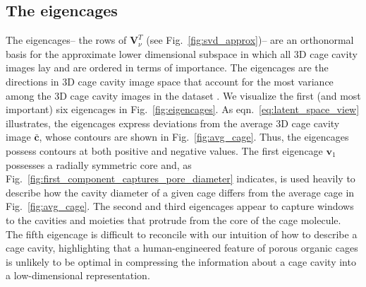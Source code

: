 \documentclass[journal=jacsat,manuscript=article,layout=traditional]{achemso}
\begin{document}
\subsection{The eigencages} The eigencages-- the rows of $\mathbf{V}_\nu^T$ (see Fig.~\ref{fig:svd_approx})-- are an orthonormal basis for the approximate lower dimensional subspace in which all 3D cage cavity images lay and are ordered in terms of importance. The eigencages are the directions in 3D cage cavity image space that account for the most variance among the 3D cage cavity images in the dataset \cite{strang1993introduction}. We visualize the first (and most important) six eigencages in Fig.~\ref{fig:eigencages}. As eqn.~\ref{eq:latent_space_view} illustrates, the eigencages express deviations from the average 3D cage cavity image $\bar{\mathbf{c}}$, whose contours are shown in Fig.~\ref{fig:avg_cage}. Thus, the eigencages possess contours at both positive and negative values. The first eigencage $\mathbf{v}_1$ possesses a radially symmetric core and, as Fig.~\ref{fig:first_component_captures_pore_diameter} indicates, is used heavily to describe how the cavity diameter of a given cage differs from the average cage in Fig.~\ref{fig:avg_cage}. The second and third eigencages appear to capture windows to the cavities and moieties that protrude from the core of the cage molecule. The fifth eigencage is difficult to reconcile with our intuition of how to describe a cage cavity, highlighting that a human-engineered feature of porous organic cages is unlikely to be optimal in compressing the information about a cage cavity into a low-dimensional representation.
\end{document}
